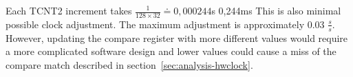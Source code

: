 Each TCNT2 increment takes $\frac{1}{128 \times 32} \doteq 0,000244$s
0,244ms
This is also minimal possible clock adjustment.
The maximum adjustment is approximately 0.03 $\frac{s}{s}$.
However, updating the compare register with more different values would require
a more complicated software design
and lower values could cause a miss of the compare match described in section~\ref{sec:analysis-hwclock}.

